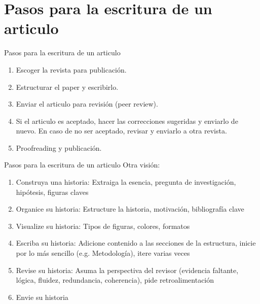\documentclass[
10pt,
aspectratio=169,
]{beamer}
\begin{document}
%
%




\section{Pasos para la escritura de un articulo}
\begin{frame}{Pasos para la escritura de un articulo}
\begin{enumerate}
\item Escoger la revista para publicaci\'on.
\item Estructurar el paper y escribirlo.
\item Enviar el articulo para revisi\'on (peer review).
\item Si el articulo es aceptado, hacer las correcciones sugeridas y enviarlo de nuevo. En caso de no ser aceptado, revisar y enviarlo a otra revista.
\item Proofreading y publicación.
\end{enumerate}
\end{frame}

\begin{frame}{Pasos para la escritura de un articulo}
Otra visi\'on:
\begin{enumerate}
\item Construya una historia: Extraiga la esencia, pregunta de investigación, hipótesis, figuras claves
\item Organice su historia: Estructure la historia, motivación, bibliografía clave
\item Visualize su historia: Tipos de figuras, colores, formatos
\item Escriba su historia: Adicione contenido a las secciones de la estructura, inicie por lo m\'as sencillo (e.g. Metodología), itere varias veces
\item Revise su historia: Asuma la perspectiva del revisor (evidencia faltante, lógica, fluidez, redundancia, coherencia), pide retroalimentaci\'on
\item Envie su historia
\end{enumerate}
\end{frame}
\end{document}
